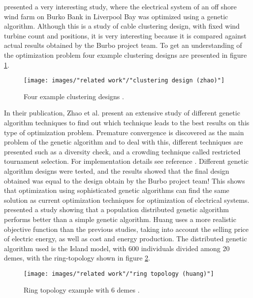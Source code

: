\noindent \cite{Zhao} presented a very interesting study, where the electrical system of an off shore wind farm on Burko Bank in Liverpool Bay was optimized using a genetic algorithm. Although this is a study of cable clustering design, with fixed wind turbine count and positions, it is very interesting because it is compared against actual results obtained by the Burbo project team. To get an understanding of the optimization problem four example clustering designs are presented in figure \ref{Clustering Design}.\\


\begin{figure}[h!]
\begin{center}
\texttt{[image: images/"related work"/"clustering design (zhao)"]}
\caption{Four example clustering designs \citep{Zhao}.}
\label{Clustering Design}
\end{center}
\end{figure}


\noindent In their publication, Zhao et al. present an extensive study of different genetic algorithm techniques to find out which technique leads to the best results on this type of optimization problem. Premature convergence is discovered as the main problem of the genetic algorithm and to deal with this, different techniques are presented such as a diversity check, and a crowding technique called restricted tournament selection. For implementation details see reference \cite{Zhao}. Different genetic algorithm designs were tested, and the results showed that the final design obtained was equal to the design obtain by the Burbo project team! This shows that optimization using sophisticated genetic algorithms can find the same solution as current optimization techniques for optimization of electrical systems.\\


\noindent \cite{Huang} presented a study showing that a population distributed genetic algorithm performs better than a simple genetic algorithm. Huang uses a more realistic objective function than the previous studies, taking into account the selling price of electric energy, as well as cost and energy production. The distributed genetic algorithm used is the Island model, with 600 individuals divided among 20 demes, with the ring-topology shown in figure \ref{Ring Topology}.\\

\begin{figure}[h!]
\begin{center}
\texttt{[image: images/"related work"/"ring topology (huang)"]}
\caption{Ring topology example with 6 demes \citep{Huang}.}
\label{Ring Topology}
\end{center}
\end{figure}



